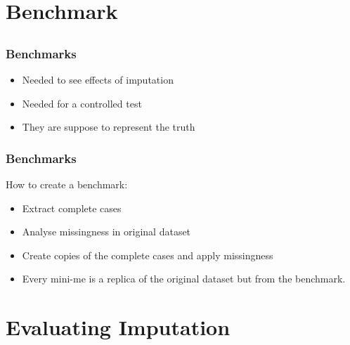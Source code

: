 \documentclass{beamer}
\begin{document}
\section{Benchmark}
\subsection{}

\begin{frame}
\frametitle{Benchmarks}
  \begin{itemize}
    \item Needed to see effects of imputation
    \item Needed for a controlled test
    \item They are suppose to represent the truth
  \end{itemize}

\end{frame}


\begin{frame}
\frametitle{Benchmarks}
How to create a benchmark:
  \begin{itemize}
    \item Extract complete cases
    \item Analyse missingness in original dataset
    \item Create copies of the complete cases and apply missingness
    \item Every mini-me is a replica of the original   dataset but from the benchmark.
  \end{itemize}
\end{frame}

\section{Evaluating Imputation}
\end{document}
